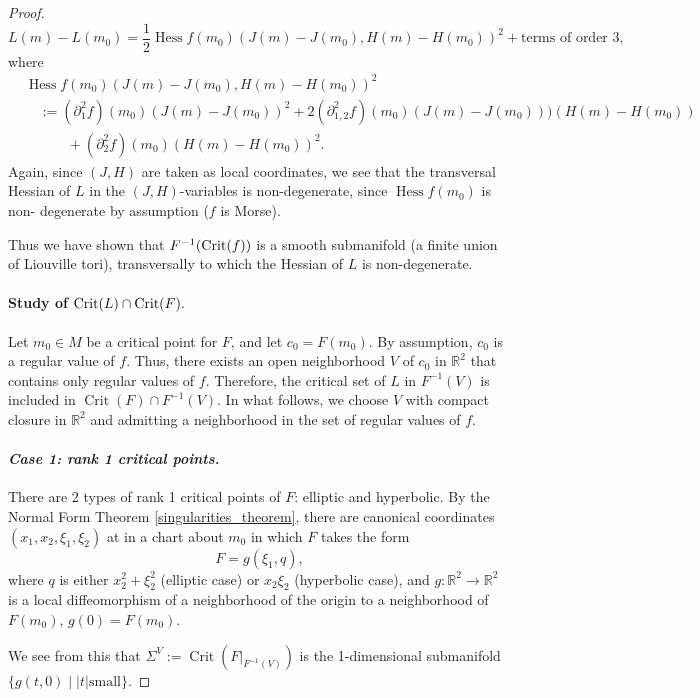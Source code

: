 \documentclass[11pt]{article}
\newcommand{\abs}[1]{\left|#1\right|}
\newcommand{\fleche}{\rightarrow}
\newcommand{\RM}{\mathbb{R}}
\begin{document}
\begin{proof}
\[
L(m)-L(m_0) = \frac{1}{2}\operatorname{Hess}f(m_0)(J(m)-J(m_0),
H(m)-H(m_0))^2 + \text{terms of order } 3,
\]
where
\begin{align}
  &\operatorname{Hess}f(m_0)(J(m)-J(m_0),H(m)-H(m_0))^2 \nonumber\\
  &\quad := (\partial^2_1f)(m_0)(J(m)-J(m_0))^2 +
  2(\partial^2_{1,2}f)(m_0)(J(m)-J(m_0)))(H(m)-H(m_0))
  \nonumber\\
  &\qquad\quad + (\partial_2^2f)(m_0)(H(m) - H(m_0))^2.
  \label{equ:hessian-f}
\end{align}
Again, since $(J,H)$ are taken as local coordinates, we see that the
transversal Hessian of $L$ in the $(J,H)$-variables is non-degenerate,
since $\operatorname{Hess}f(m_0)$ is non- degenerate by assumption
($f$ is Morse).

Thus we have shown that $F^{-1}(\textup{Crit}(f))$ is a smooth
submanifold (a finite union of Liouville tori), transversally to which
the Hessian of $L$ is non-degenerate.

\paragraph{Study of $\textup{Crit}(L) \cap \textup{Crit}(F).$}
Let $m_0\in M$ be a critical point for $F$, and let $c_0=F(m_0)$. By
assumption, $c_0$ is a regular value of $f$.  Thus, there exists an
open neighborhood $V$ of $c_0$ in $\RM^2$ that contains only regular
values of $f$. Therefore, the critical set of $L$ in $F^{-1}(V)$ is
included in $\operatorname{Crit}(F)\cap F^{-1}(V)$. In what follows,
we choose $V$ with compact closure in $\RM^2$ and admitting a
neighborhood in the set of regular values of $f$.

\paragraph{\emph{Case 1: rank 1 critical points.}}

There are 2 types of rank 1 critical points of $F$: elliptic and
hyperbolic. By the Normal Form Theorem \ref{singularities_theorem},
there are canonical coordinates $(x_1,x_2,\xi_1,\xi_2)$ at in a chart
about $m_0$ in which $F$ takes the form
\[
F=g(\xi_1,q),
\]
where $q$ is either $x_2^2+\xi_2^2$ (elliptic case) or $x_2\xi_2$
(hyperbolic case), and $g:\RM^2\fleche\RM^2$ is a local diffeomorphism
of a neighborhood of the origin to a neighborhood of $F(m_0)$,
$g(0)=F(m_0)$.

We see from this that
$\Sigma^V:=\operatorname{Crit}\left(F|_{F^{-1}(V)}\right)$ is the
1-dimensional submanifold $\{g(t,0)\mid \abs{t} \text{small}\}$.


\end{proof}
\end{document}
